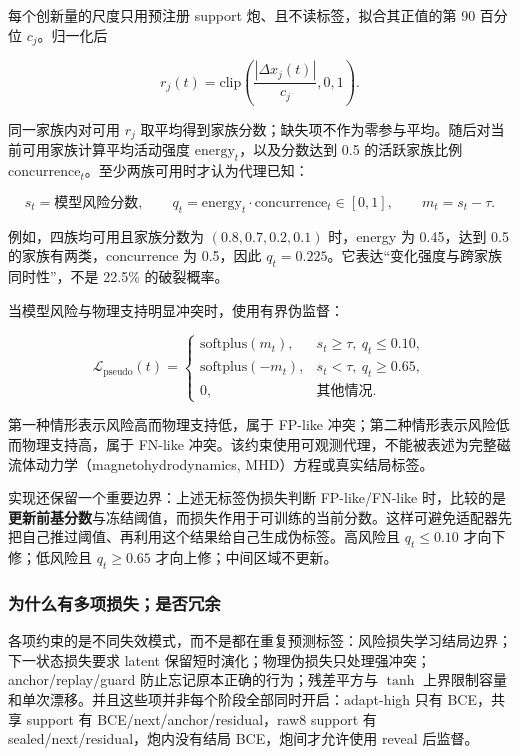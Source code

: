 \documentclass[11pt,a4paper]{article}
\begin{document}
每个创新量的尺度只用预注册 support 炮、且不读标签，拟合其正值的第 90 百分位 \(c_j\)。归一化后

\[
r_j(t)=\mathrm{clip}\!\left(\frac{|\Delta x_j(t)|}{c_j},0,1\right).
\]

同一家族内对可用 \(r_j\) 取平均得到家族分数；缺失项不作为零参与平均。随后对当前可用家族计算平均活动强度 \(\mathrm{energy}_t\)，以及分数达到 0.5 的活跃家族比例 \(\mathrm{concurrence}_t\)。至少两族可用时才认为代理已知：

\begin{equation}
s_t=\text{模型风险分数},\qquad
q_t=\mathrm{energy}_t\cdot\mathrm{concurrence}_t\in[0,1],
\qquad
m_t=s_t-\tau.
\label{eq:physics-support}
\end{equation}

例如，四族均可用且家族分数为 \((0.8,0.7,0.2,0.1)\) 时，energy 为 0.45，达到 0.5 的家族有两类，concurrence 为 0.5，因此 \(q_t=0.225\)。它表达“变化强度与跨家族同时性”，不是 22.5\% 的破裂概率。

当模型风险与物理支持明显冲突时，使用有界伪监督：

\begin{equation}
\mathcal{L}_{\mathrm{pseudo}}(t)=
\begin{cases}
\mathrm{softplus}(m_t),
&s_t\geq\tau,\ q_t\leq0.10,\\
\mathrm{softplus}(-m_t),
&s_t<\tau,\ q_t\geq0.65,\\
0,&\text{其他情况}.
\end{cases}
\label{eq:pseudo-loss}
\end{equation}

第一种情形表示风险高而物理支持低，属于 FP-like 冲突；第二种情形表示风险低而物理支持高，属于 FN-like 冲突。该约束使用可观测代理，不能被表述为完整磁流体动力学（magnetohydrodynamics, MHD）方程或真实结局标签。

实现还保留一个重要边界：上述无标签伪损失判断 FP-like/FN-like 时，比较的是\textbf{更新前基分数}与冻结阈值，而损失作用于可训练的当前分数。这样可避免适配器先把自己推过阈值、再利用这个结果给自己生成伪标签。高风险且 \(q_t\leq0.10\) 才向下修；低风险且 \(q_t\geq0.65\) 才向上修；中间区域不更新。

\subsubsection{为什么有多项损失；是否冗余}

各项约束的是不同失效模式，而不是都在重复预测标签：风险损失学习结局边界；下一状态损失要求 latent 保留短时演化；物理伪损失只处理强冲突；anchor/replay/guard 防止忘记原本正确的行为；残差平方与 \(\tanh\) 上界限制容量和单次漂移。并且这些项并非每个阶段全部同时开启：adapt-high 只有 BCE，共享 support 有 BCE/next/anchor/residual，raw8 support 有 sealed/next/residual，炮内没有结局 BCE，炮间才允许使用 reveal 后监督。
\end{document}
